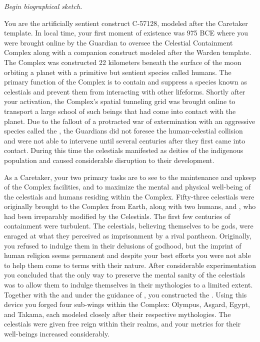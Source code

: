 \documentclass[char]{guardians}
\begin{document}
\name{\cCaretaker{}}

\emph{Begin biographical sketch.}

You are the artificially sentient construct C-57128, modeled after the Caretaker template. In local time, your first moment of existence was 975 BCE where you were brought online by the Guardian \cJascha{\intro} to oversee the Celestial Containment Complex along with a companion construct modeled after the Warden template. The Complex was constructed 22 kilometers beneath the surface of the moon orbiting a planet with a primitive but sentient species called humans. The primary function of the Complex is to contain and suppress a species known as celestials and prevent them from interacting with other lifeforms. Shortly after your activation, the Complex's spatial tunneling grid was brought online to transport a large school of such beings that had come into contact with the planet. Due to the fallout of a protracted war of extermination with an aggressive species called the \evilRace{}, the Guardians did not foresee the human-celestial collision and were not able to intervene until several centuries after they first came into contact. During this time the celestials manifested as deities of the indigenous population and caused considerable disruption to their development.

As a Caretaker, your two primary tasks are to see to the maintenance and upkeep of the Complex facilities, and to maximize the mental and physical well-being of the celestials and humans residing within the Complex. Fifty-three celestials were originally brought to the Complex from Earth, along with two humans, \cPandora{} and \cEgyptianHuman{}, who had been irreparably modified by the Celestials. The first few centuries of containment were turbulent. The celestials, believing themselves to be gods, were enraged at what they perceived as imprisonment by a rival pantheon. Originally, you refused to indulge them in their delusions of godhood, but the imprint of human religion seems permanent and despite your best efforts you were not able to help them come to terms with their nature. After considerable experimentation you concluded that the only way to preserve the mental sanity of the celestials was to allow them to indulge themselves in their mythologies to a limited extent. Together with the \cWarden{} and under the guidance of \cJascha{}, you constructed the \stone{}. Using this device you forged four sub-wings within the Complex: Olympus, Asgard, Egypt, and Takama, each modeled closely after their respective mythologies. The celestials were given free reign within their realms, and your metrics for their well-beings increased considerably.
\end{document}
